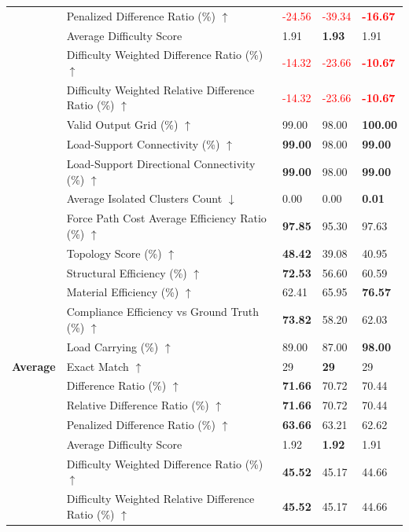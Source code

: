 \begin{table}[!h]
{\begin{tabular}{lllll}
 & Penalized Difference Ratio (\%) $\uparrow$ & \textcolor{red}{-24.56} & \textcolor{red}{-39.34} & \textbf{\textcolor{red}{-16.67}} \\
 & Average Difficulty Score & 1.91 & \textbf{1.93} & 1.91 \\
 & Difficulty Weighted Difference Ratio (\%) $\uparrow$ & \textcolor{red}{-14.32} & \textcolor{red}{-23.66} & \textbf{\textcolor{red}{-10.67}} \\
 & Difficulty Weighted Relative Difference Ratio (\%) $\uparrow$ & \textcolor{red}{-14.32} & \textcolor{red}{-23.66} & \textbf{\textcolor{red}{-10.67}} \\
 & Valid Output Grid (\%) $\uparrow$ & 99.00 & 98.00 & \textbf{100.00} \\
 & Load-Support Connectivity (\%) $\uparrow$ & \textbf{99.00} & 98.00 & \textbf{99.00} \\
 & Load-Support Directional Connectivity (\%) $\uparrow$ & \textbf{99.00} & 98.00 & \textbf{99.00} \\
 & Average Isolated Clusters Count $\downarrow$ & 0.00 & 0.00 & \textbf{0.01} \\
 & Force Path Cost Average Efficiency Ratio (\%) $\uparrow$ & \textbf{97.85} & 95.30 & 97.63 \\
 & Topology Score (\%) $\uparrow$ & \textbf{48.42} & 39.08 & 40.95 \\
 & Structural Efficiency (\%) $\uparrow$ & \textbf{72.53} & 56.60 & 60.59 \\
 & Material Efficiency (\%) $\uparrow$ & 62.41 & 65.95 & \textbf{76.57} \\
 & Compliance Efficiency vs Ground Truth (\%) $\uparrow$ & \textbf{73.82} & 58.20 & 62.03 \\
 & Load Carrying (\%) $\uparrow$ & 89.00 & 87.00 & \textbf{98.00} \\
\midrule
\textbf{Average} & Exact Match $\uparrow$ & 29 & \textbf{29} & 29 \\
 & Difference Ratio (\%) $\uparrow$ & \textbf{71.66} & 70.72 & 70.44 \\
 & Relative Difference Ratio (\%) $\uparrow$ & \textbf{71.66} & 70.72 & 70.44 \\
 & Penalized Difference Ratio (\%) $\uparrow$ & \textbf{63.66} & 63.21 & 62.62 \\
 & Average Difficulty Score & 1.92 & \textbf{1.92} & 1.91 \\
 & Difficulty Weighted Difference Ratio (\%) $\uparrow$ & \textbf{45.52} & 45.17 & 44.66 \\
 & Difficulty Weighted Relative Difference Ratio (\%) $\uparrow$ & \textbf{45.52} & 45.17 & 44.66 \\

\end{tabular}}
\end{table}
